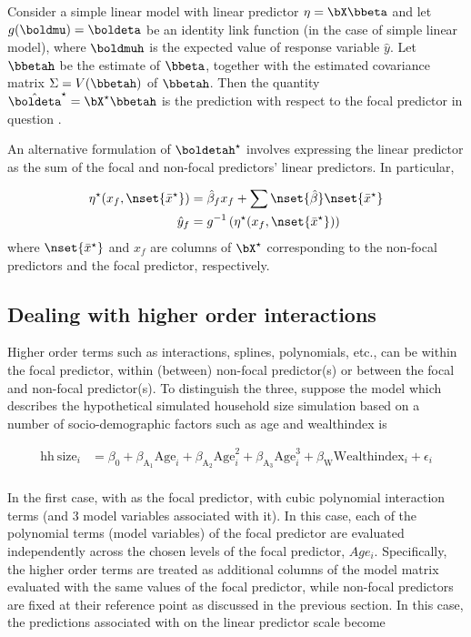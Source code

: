 Consider a simple linear model with linear predictor $\eta = \bX\bbeta$ and let $g(\boldmu) = \boldeta$ be an identity link function (in the case of simple linear model), where $\boldmuh$ is the expected value of response variable $\hat{y}$. Let $\bbetah$ be the estimate of $\bbeta$, together with the estimated covariance matrix $\Sigma = V(\bbetah)$ of $\bbetah$. Then the quantity $\hat{\boldeta}^\star = \bX^\star\bbetah$ is the prediction with respect to the focal predictor in question \citep{fox2009effect}.

An alternative formulation of $\boldetah^\star$ involves expressing the linear predictor as the sum of the focal and non-focal predictors' linear predictors. In particular, 

\begin{align}\label{eq:eta_mean}
\eta^\star(x_f, \nset{{\bar{x}^\star}}) &= \hat{\beta}_f x_f + \sum \nset{\hat{\beta}} \nset{{\bar{x}^\star}} \\
\hat{y}_f  &= g^{-1} \left(\eta^\star(x_f, \nset{{\bar{x}^\star}})\right)
\end{align}
where $\nset{{\bar{x}^\star}}$ and $x_f$ are columns of $\bX^\star$ corresponding to the non-focal predictors and the focal predictor, respectively.


\subsection{Dealing with higher order interactions}

Higher order terms such as interactions, splines, polynomials, etc., can be within the focal predictor, within (between) non-focal predictor(s) or between the focal and non-focal predictor(s). To distinguish the three, suppose the model which describes the hypothetical simulated household size simulation based on a number of socio-demographic factors such as age and wealthindex is

\begin{align}\label{sim:lm_cubic}
\mathrm{hh~size}_i &= \beta_0 + \beta_{\mathrm{A_1}}\mathrm{Age}_i + \beta_{\mathrm{A_2}}\mathrm{Age}^2_i + \beta_{\mathrm{A_3}}\mathrm{Age}^3_i + \beta_{\mathrm{W}}\mathrm{Wealthindex}_i + \epsilon_i \nonumber\\
\end{align}

In the first case, with  as the focal predictor, with cubic polynomial interaction terms (and 3 model variables associated with it). In this case, each of the polynomial terms (model variables) of the focal predictor are evaluated independently across the chosen levels of the focal predictor, $Age_i$. Specifically, the higher order terms are treated as additional columns of the model matrix evaluated with the same values of the focal predictor, while non-focal predictors are fixed at their reference point as discussed in the previous section. In this case, the predictions associated with  on the linear predictor scale become

